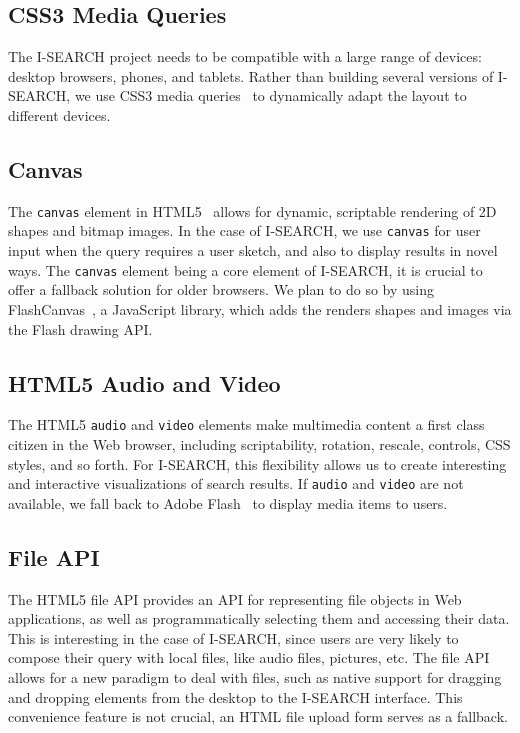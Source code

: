 \documentclass[runningheads,a4paper]{llncs} \usepackage[utf8]{inputenc}
\begin{document}
\subsection{CSS3 Media Queries} 
The \mbox{I-SEARCH} project needs to be compatible with a large range of devices: desktop browsers, phones, and tablets. Rather than building several versions of \mbox{I-SEARCH}, we use CSS3 media queries~\cite{css3} to dynamically adapt the layout to different devices. 

\subsection{Canvas}
The \texttt{canvas} element in HTML5~\cite{html5} allows for dynamic, scriptable rendering of 2D shapes and bitmap images. In the case of \mbox{I-SEARCH}, we use \texttt{canvas} for user input when the query requires a user sketch, and also to display results in novel ways. The \texttt{canvas} element being a core element of \mbox{I-SEARCH}, it is crucial to offer a fallback solution for older browsers. We plan to do so by using FlashCanvas~\cite{flashcanvas}, a JavaScript library, which adds the renders shapes and images via the Flash drawing API.

\subsection{HTML5 Audio and Video}
The HTML5 \texttt{audio} and \texttt{video} elements make multimedia content a first class citizen in the Web browser, including scriptability, rotation, rescale, controls, CSS styles, and so forth. For \mbox{I-SEARCH}, this flexibility allows us to create interesting and interactive visualizations of search results. If \texttt{audio} and \texttt{video} are not available, we fall back to Adobe Flash~\cite{flash} to display media items to users.

\subsection{File API}
The HTML5 file API provides an API for representing file objects in Web applications, as well as programmatically selecting them and accessing their data. This is interesting in the case of \mbox{I-SEARCH}, since users are very likely to compose their query with local files, like audio files, pictures, etc. The file API allows for a new paradigm to deal with files, such as native support for dragging and dropping elements from the desktop to the \mbox{I-SEARCH} interface. This convenience feature is not crucial, an HTML file upload form serves as a fallback.
\end{document}
